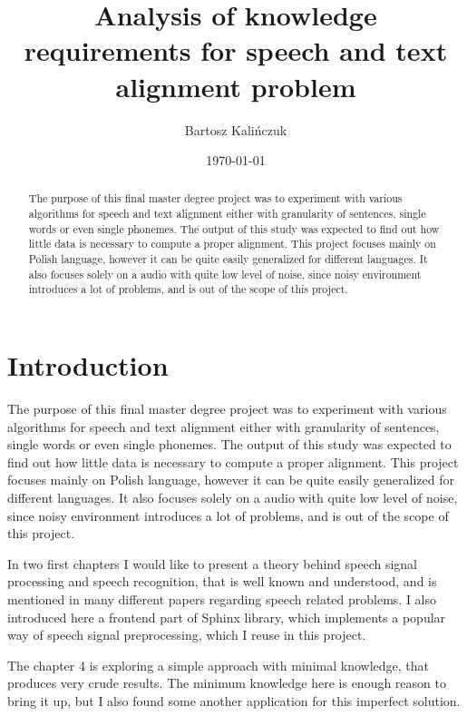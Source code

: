 \documentclass[12pt,a4paper,english]{article}
\begin{document}
\title{Analysis of knowledge requirements for speech and text alignment problem}
\author{Bartosz Kalińczuk}
\date{\today}
\maketitle

\newpage
\begin{abstract}
The purpose of this final master degree project was to experiment with various algorithms for speech and text alignment either with granularity of sentences, single words or even single phonemes. The output of this study was expected to find out how little data is necessary to compute a proper alignment. This project focuses mainly on Polish language, however it can be quite easily generalized for different languages. It also focuses solely on a audio with quite low level of noise, since noisy environment introduces a lot of problems, and is out of the scope of this project.
\end{abstract}


\newpage
\setcounter{tocdepth}{2}
\tableofcontents

\newpage
\section{Introduction}

The purpose of this final master degree project was to experiment with various algorithms for speech and text alignment either with granularity of sentences, single words or even single phonemes. The output of this study was expected to find out how little data is necessary to compute a proper alignment. This project focuses mainly on Polish language, however it can be quite easily generalized for different languages. It also focuses solely on a audio with quite low level of noise, since noisy environment introduces a lot of problems, and is out of the scope of this project. \newline

In two first chapters I would like to present a theory behind speech signal processing and speech recognition,
that is well known and understood, and is mentioned in many different papers regarding speech related problems. I also introduced here a frontend part of Sphinx library, which implements a popular way of speech signal preprocessing, which I reuse in this project. \newline

The chapter 4 is exploring a simple approach with minimal knowledge, that produces very crude results. The minimum knowledge here is enough reason to bring it up, but I also found some another application for this imperfect solution. \newline
\end{document}
